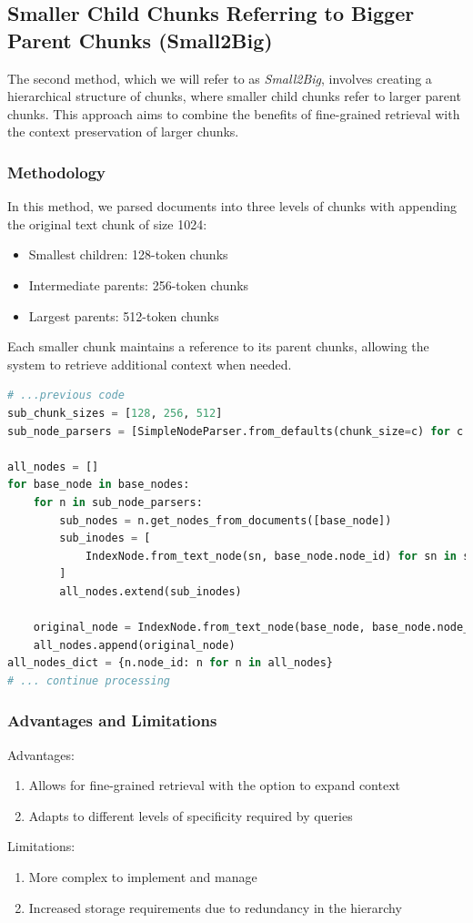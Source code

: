 \subsection{Smaller Child Chunks Referring to Bigger Parent Chunks (Small2Big)}\label{subsec:smaller-child-chunks-referring-to-bigger-parent-chunks}
The second method, which we will refer to as \textit{Small2Big}, involves creating a hierarchical structure of chunks, where smaller child chunks refer to larger parent chunks.
This approach aims to combine the benefits of fine-grained retrieval with the context preservation of larger chunks.
\subsubsection{Methodology}
In this method, we parsed documents into three levels of chunks with appending the original text chunk of size 1024:
\begin{itemize}
    \item Smallest children: 128-token chunks
    \item Intermediate parents: 256-token chunks
    \item Largest parents: 512-token chunks
\end{itemize}
Each smaller chunk maintains a reference to its parent chunks, allowing the system to retrieve additional context when needed.

\begin{lstlisting}[language=Python, caption=Small2Big Chunking Method, label=lst:small2big_chunking]
# ...previous code
sub_chunk_sizes = [128, 256, 512]
sub_node_parsers = [SimpleNodeParser.from_defaults(chunk_size=c) for c in sub_chunk_sizes]

all_nodes = []
for base_node in base_nodes:
    for n in sub_node_parsers:
        sub_nodes = n.get_nodes_from_documents([base_node])
        sub_inodes = [
            IndexNode.from_text_node(sn, base_node.node_id) for sn in sub_nodes
        ]
        all_nodes.extend(sub_inodes)

    original_node = IndexNode.from_text_node(base_node, base_node.node_id) # also add original node to node
    all_nodes.append(original_node)
all_nodes_dict = {n.node_id: n for n in all_nodes}
# ... continue processing
\end{lstlisting}

\subsubsection{Advantages and Limitations}
Advantages:
\begin{enumerate}
    \item Allows for fine-grained retrieval with the option to expand context
    \item Adapts to different levels of specificity required by queries
\end{enumerate}
Limitations:
\begin{enumerate}
    \item More complex to implement and manage
    \item Increased storage requirements due to redundancy in the hierarchy
\end{enumerate}

